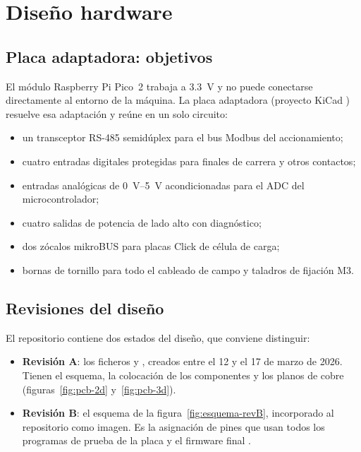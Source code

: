 \chapter{Diseño hardware}
\label{chap:hardware}

\section{Placa adaptadora: objetivos}

El módulo Raspberry Pi Pico~2 trabaja a \SI{3.3}{\volt} y no puede conectarse directamente al
entorno de la máquina. La placa adaptadora (proyecto KiCad ) resuelve esa
adaptación y reúne en un solo circuito:

\begin{itemize}
  \item un transceptor RS-485 semidúplex para el bus Modbus del accionamiento;
  \item cuatro entradas digitales protegidas para finales de carrera y otros contactos;
  \item entradas analógicas de \SIrange{0}{5}{\volt} acondicionadas para el ADC del microcontrolador;
  \item cuatro salidas de potencia de lado alto con diagnóstico;
  \item dos zócalos mikroBUS para placas Click de célula de carga;
  \item bornas de tornillo para todo el cableado de campo y taladros de fijación M3.
\end{itemize}

\section{Revisiones del diseño}

El repositorio contiene dos estados del diseño, que conviene distinguir:

\begin{itemize}
  \item \textbf{Revisión A}: los ficheros  y
        , creados entre el 12 y el 17 de marzo de 2026. Tienen el esquema, la
        colocación de los componentes y los planos de cobre (figuras~\ref{fig:pcb-2d}
        y~\ref{fig:pcb-3d}).
  \item \textbf{Revisión B}: el esquema de la figura~\ref{fig:esquema-revB}, incorporado al
        repositorio como imagen. Es la asignación de pines que usan todos los programas de prueba
        de la placa y el firmware final .
\end{itemize}

